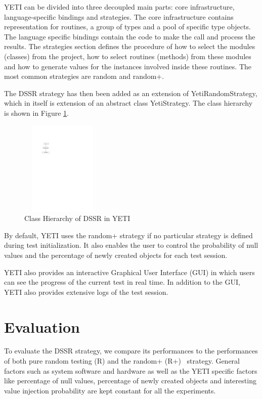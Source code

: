 \documentclass[conference]{IEEEtran}
\begin{document}
YETI can be divided into three decoupled main parts: core infrastructure, language-specific bindings and strategies. The core infrastructure contains representation for routines, a group of types and a pool of specific type objects. The language specific bindings contain the code to make the call and process the results. The strategies section defines the procedure of how to select the modules (classes) from the project, how to select routines (methods) from these modules and how to generate values for the instances involved inside these routines. The most common strategies are random and random+. 

The DSSR strategy has then been added as an extension of YetiRandomStrategy, which in itself is extension of an abstract class YetiStrategy. The class hierarchy is shown in Figure \ref{fig:hierarchyofDSSR}.

\begin{figure}[h]
\centering
\includegraphics[width=4cm,height=4.5cm]{hierarchy.pdf}
\caption{Class Hierarchy of DSSR in YETI}
\label{fig:hierarchyofDSSR}
\end{figure}


By default, YETI uses the random+ strategy if no particular strategy is defined during test initialization. It also enables the user to control the probability of null values and the percentage of newly created objects for each test session.

YETI also provides an interactive Graphical User Interface (GUI) in which users can see the progress of the current test in real time. In addition to the GUI, YETI also provides extensive logs of the test session.




\section{Evaluation}\label{sec:eval}

To evaluate the DSSR strategy, we compare its performances to the performances of both pure random testing (R) and the random+ (R+)~\cite{Oriol2010} strategy. General factors such as system software and hardware as well as the YETI specific factors like percentage of null values, percentage of newly created objects and interesting value injection probability are kept constant for all the experiments.\\
\end{document}
